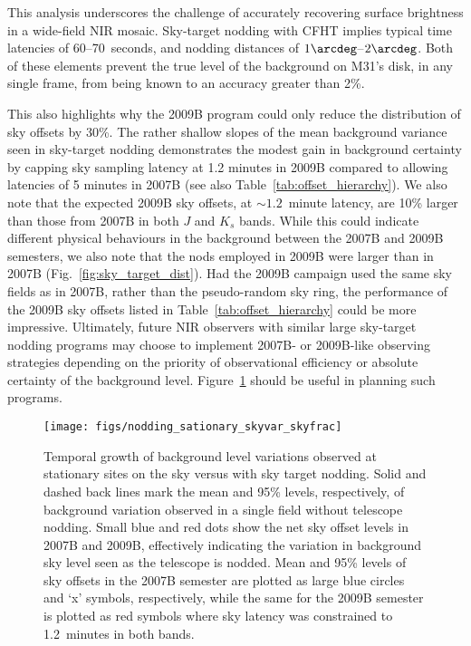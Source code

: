 \documentclass[iop,tighten]{emulateapj}
\newcommand{\Fig}[1]{Fig.~\ref{fig:#1}}  %
\newcommand{\Tab}[1]{Table~\ref{tab:#1}}  %
\begin{document}
This analysis underscores the challenge of accurately recovering surface brightness in a wide-field NIR mosaic.
Sky-target nodding with CFHT implies typical time latencies of 60--70~seconds, and nodding distances of $1\arcdeg$--$2\arcdeg$.
Both of these elements prevent the true level of the background on M31's disk, in any single frame, from being known to an accuracy greater than 2\%.

This also highlights why the 2009B program could only reduce the distribution of sky offsets by 30\%.
The rather shallow slopes of the mean background variance seen in sky-target nodding demonstrates the modest gain in background certainty by capping sky sampling latency at 1.2 minutes in 2009B compared to allowing latencies of 5 minutes in 2007B (see also \Tab{offset_hierarchy}).
We also note that the expected 2009B sky offsets, at $\sim1.2$~minute latency, are 10\% larger than those from 2007B in both $J$ and $K_s$ bands.
While this could indicate different physical behaviours in the background between the 2007B and 2009B semesters, we also note that the nods employed in 2009B were larger than in 2007B (\Fig{sky_target_dist}).
Had the 2009B campaign used the same sky fields as in 2007B, rather than the pseudo-random sky ring, the performance of the 2009B sky offsets listed in \Tab{offset_hierarchy} could be more impressive.
Ultimately, future NIR observers with similar large sky-target nodding programs may choose to implement 2007B- or 2009B-like observing strategies depending on the priority of observational efficiency or absolute certainty of the background level.
Figure~\ref{fig:nodding_stationary_skyvar_skyfrac} should be useful in planning such programs.

\begin{figure}[t]
\centering
\texttt{[image: figs/nodding\_sationary\_skyvar\_skyfrac]}
\caption{Temporal growth of background level variations observed at stationary sites on the sky versus with sky target nodding.
Solid and dashed back lines mark the mean and 95\% levels, respectively, of background variation observed in a single field without telescope nodding.
Small blue and red dots show the net sky offset levels in 2007B and 2009B, effectively indicating the variation in background sky level seen as the telescope is nodded.
Mean and 95\% levels of sky offsets in the 2007B semester are plotted as large blue circles and `x' symbols, respectively, while the same for the 2009B semester is plotted as red symbols where sky latency was constrained to 1.2~minutes in both bands.}
\label{fig:nodding_stationary_skyvar_skyfrac}
\end{figure}
\end{document}

